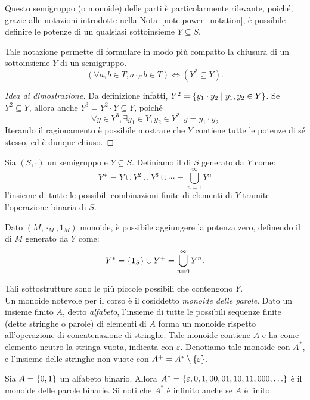 Questo semigruppo (o monoide) delle parti è particolarmente rilevante, poiché, grazie alle notazioni introdotte nella Nota~\ref{note:power_notation}, è possibile definire le potenze di un qualsiasi sottoinsieme \(Y \subseteq S\).

Tale notazione permette di formulare in modo più compatto la chiusura di un sottoinsieme \(Y\) di un semigruppo.
  \[(\forall a,b \in T, a \cdot_S b \in T)\iff (Y^2 \subseteq Y).\]
\begin{proof}[Idea di dimostrazione]\label{proof:alt_notation_closure}
  Da definizione infatti, \(Y^2 = \set{y_1 \cdot y_2}[y_1,y_2 \in Y]\). Se \(Y^2 \subseteq Y\), allora anche \(Y^3 = Y^2 \cdot Y \subseteq Y\), poiché
  \[\forall y \in Y^3, \exists y_1 \in Y, y_2 \in Y^2: y = y_1 \cdot y_2\]
  Iterando il ragionamento è possibile mostrare che \(Y\) contiene tutte le potenze di sé stesso, ed è dunque chiuso.
\end{proof}

\begin{definition}
  Sia \((S,\cdot)\) un semigruppo e \(Y \subseteq S\).
  Definiamo il  di \(S\) generato da \(Y\) come:
  \[Y^+ = Y \cup Y^2 \cup Y^3 \cup \cdots = \bigcup_{n=1}^{\infty} Y^n\]
  l'insieme di tutte le possibili combinazioni finite di elementi di \(Y\) tramite l'operazione binaria di \(S\).

  Dato \((M,\cdot_M,1_M)\) monoide, è possibile aggiungere la potenza zero, definendo il  di \(M\) generato da \(Y\) come:
  \[Y^* = \set{1_S} \cup Y^+ = \bigcup_{n=0}^{\infty} Y^n.\]
\end{definition}

Tali sottostrutture sono le più piccole possibili che contengono \(Y\).\\
Un monoide notevole per il corso è il cosiddetto \emph{monoide delle parole}.
Dato un insieme finito \(A\), detto \emph{alfabeto}, l'insieme di tutte le possibili sequenze finite (dette stringhe o parole) di elementi di \(A\) forma un monoide rispetto all'operazione di concatenazione di stringhe. 
Tale monoide contiene \(A\) e ha come elemento neutro la stringa vuota, indicata con \(\varepsilon\).
Denotiamo tale monoide con \(A^*\), e l'insieme delle stringhe non vuote con \(A^+ = A^* \setminus \set\varepsilon\).

\begin{example}
  Sia \(A = \set{0,1}\) un alfabeto binario.
  Allora \(A^* = \set{\varepsilon, 0, 1, 00, 01, 10, 11, 000, \ldots}\) è il monoide delle parole binarie.
  Si noti che \(A^*\) è infinito anche se \(A\) è finito.
\end{example}


